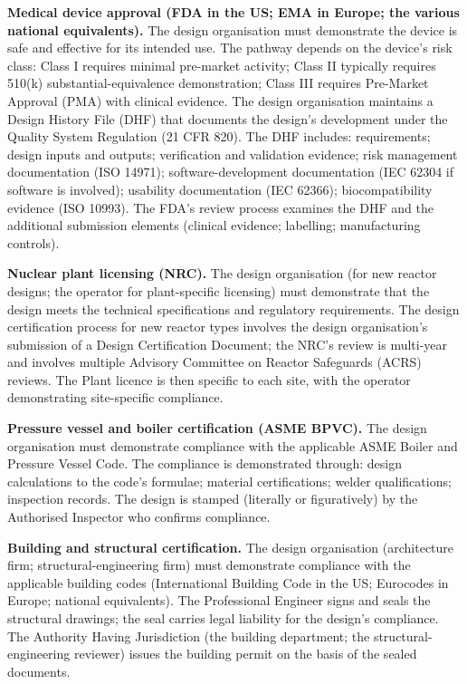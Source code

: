\textbf{Medical device approval (FDA in the US; EMA in Europe; the various national equivalents).} The design organisation must demonstrate the device is safe and effective for its intended use. The pathway depends on the device's risk class: Class I requires minimal pre-market activity; Class II typically requires 510(k) substantial-equivalence demonstration; Class III requires Pre-Market Approval (PMA) with clinical evidence. The design organisation maintains a Design History File (DHF) that documents the design's development under the Quality System Regulation (21 CFR 820). The DHF includes: requirements; design inputs and outputs; verification and validation evidence; risk management documentation (ISO 14971); software-development documentation (IEC 62304 if software is involved); usability documentation (IEC 62366); biocompatibility evidence (ISO 10993). The FDA's review process examines the DHF and the additional submission elements (clinical evidence; labelling; manufacturing controls).

\textbf{Nuclear plant licensing (NRC).} The design organisation (for new reactor designs; the operator for plant-specific licensing) must demonstrate that the design meets the technical specifications and regulatory requirements. The design certification process for new reactor types involves the design organisation's submission of a Design Certification Document; the NRC's review is multi-year and involves multiple Advisory Committee on Reactor Safeguards (ACRS) reviews. The Plant licence is then specific to each site, with the operator demonstrating site-specific compliance.

\textbf{Pressure vessel and boiler certification (ASME BPVC).} The design organisation must demonstrate compliance with the applicable ASME Boiler and Pressure Vessel Code. The compliance is demonstrated through: design calculations to the code's formulae; material certifications; welder qualifications; inspection records. The design is stamped (literally or figuratively) by the Authorised Inspector who confirms compliance.

\textbf{Building and structural certification.} The design organisation (architecture firm; structural-engineering firm) must demonstrate compliance with the applicable building codes (International Building Code in the US; Eurocodes in Europe; national equivalents). The Professional Engineer signs and seals the structural drawings; the seal carries legal liability for the design's compliance. The Authority Having Jurisdiction (the building department; the structural-engineering reviewer) issues the building permit on the basis of the sealed documents.

